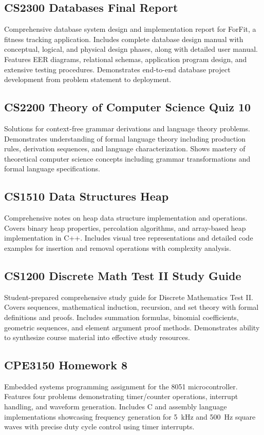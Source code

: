 \documentclass{mst}
\begin{document}
\subsection*{CS2300 Databases Final Report}
Comprehensive database system design and implementation report for ForFit, a fitness tracking application. Includes complete database design manual with conceptual, logical, and physical design phases, along with detailed user manual. Features EER diagrams, relational schemas, application program design, and extensive testing procedures. Demonstrates end-to-end database project development from problem statement to deployment.

\subsection*{CS2200 Theory of Computer Science Quiz 10}
Solutions for context-free grammar derivations and language theory problems. Demonstrates understanding of formal language theory including production rules, derivation sequences, and language characterization. Shows mastery of theoretical computer science concepts including grammar transformations and formal language specifications.

\subsection*{CS1510 Data Structures Heap}
Comprehensive notes on heap data structure implementation and operations. Covers binary heap properties, percolation algorithms, and array-based heap implementation in C++. Includes visual tree representations and detailed code examples for insertion and removal operations with complexity analysis.

\subsection*{CS1200 Discrete Math Test II Study Guide}
Student-prepared comprehensive study guide for Discrete Mathematics Test II. Covers sequences, mathematical induction, recursion, and set theory with formal definitions and proofs. Includes summation formulas, binomial coefficients, geometric sequences, and element argument proof methods. Demonstrates ability to synthesize course material into effective study resources.

\subsection*{CPE3150 Homework 8}
Embedded systems programming assignment for the 8051 microcontroller. Features four problems demonstrating timer/counter operations, interrupt handling, and waveform generation. Includes C and assembly language implementations showcasing frequency generation for 5~kHz and 500~Hz square waves with precise duty cycle control using timer interrupts.
\end{document}
